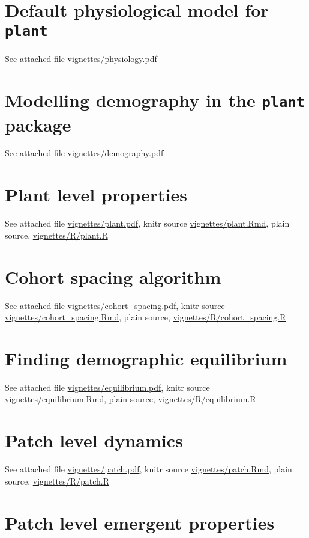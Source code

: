 \documentclass[a4paper,11pt]{article}
\newcommand{\plant}{\texttt{plant}}
\begin{document}
\begin{appendices}\label{sec:appendices}

\section{Default physiological model for {\plant}}\label{sec:FFW16}

See attached file \url{vignettes/physiology.pdf}

\section{Modelling demography in the {\plant} package}\label{sec:demography}

See attached file \url{vignettes/demography.pdf}

\section{Plant level properties}\label{sec:plant}

See attached file \url{vignettes/plant.pdf}, knitr source
\url{vignettes/plant.Rmd}, plain source, \url{vignettes/R/plant.R}

\section{Cohort spacing algorithm}\label{sec:cohort-spacing}

See attached file \url{vignettes/cohort_spacing.pdf}, knitr source
\url{vignettes/cohort_spacing.Rmd}, plain source, \url{vignettes/R/cohort_spacing.R}

\section{Finding demographic equilibrium}\label{sec:equilibrium}

See attached file \url{vignettes/equilibrium.pdf}, knitr source
\url{vignettes/equilibrium.Rmd}, plain source, \url{vignettes/R/equilibrium.R}

\section{Patch level dynamics}\label{sec:patch}

See attached file \url{vignettes/patch.pdf}, knitr source
\url{vignettes/patch.Rmd}, plain source, \url{vignettes/R/patch.R}

\section{Patch level emergent properties}\label{sec:emergent}


\end{appendices}
\end{document}
